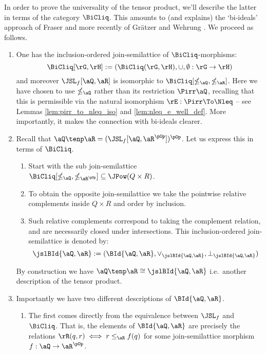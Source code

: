 \documentclass{article}
\begin{document}
In order to prove the universality of the tensor product, we'll describe the latter in terms of the category $\BiCliq$. This amounts to (and explains) the `bi-ideals' approach of Fraser \cite{Fraser1978} and more recently of Gr\"{a}tzer and Wehrung \cite{GratzerTensorSemilattices2005}. We proceed as follows.
\begin{enumerate}
\item
One has the inclusion-ordered join-semilattice of $\BiCliq$-morphisms:
\[
\BiCliq[\rG,\rH] := (\BiCliq(\rG,\rH),\cup,\emptyset : \rG \to \rH)
\]
and moreover $\JSL_f[\aQ,\aR]$ is isomorphic to $\BiCliq[\nleq_\aQ, \nleq_\aR]$. Here we have chosen to use $\nleq_\aQ$ rather than its restriction $\Pirr\aQ$, recalling that this is permissible via the natural isomorphism $\rE : \Pirr \To \Nleq$ -- see Lemmas \ref{lem:pirr_to_nleq_iso} and \ref{lem:nleq_e_well_def}. More importantly, it makes the connection with bi-ideals clearer.

\item
Recall that $\aQ \tenp \aR = (\JSL_f[\aQ,\aR^{\pOp}])^{\pOp}$. Let us express this in terms of $\BiCliq$.
\begin{enumerate}
\item
Start with the sub join-semilattice $\BiCliq[\nleq_\aQ,\nleq_{\aR^{\pOp}}] \subseteq \JPow (Q \times R)$.
\item
To obtain the opposite join-semilattice we take the pointwise relative complements inside $Q \times R$ and order by inclusion.
\item
Such relative complements correspond to taking the complement relation, and are necessarily closed under intersections. This inclusion-ordered join-semilattice is denoted by:
\[
\jslBId{\aQ,\aR} := (\BId{\aQ,\aR},\lor_{\jslBId{\aQ,\aR}},\bot_{\jslBId{\aQ,\aR}})
\]
\end{enumerate}

By construction we have $\aQ \tenp \aR \cong \jslBId{\aQ,\aR}$ i.e.\ another description of the tensor product.

\item
Importantly we have two different descriptions of $\BId{\aQ,\aR}$.

\begin{enumerate}
\item
The first comes directly from the equivalence between $\JSL_f$ and $\BiCliq$. That is, the  elements of $\BId{\aQ,\aR}$ are precisely the relations $\rR(q,r) \iff r \leq_\aR f(q)$ for some join-semilattice morphism $f : \aQ \to \aR^{\pOp}$.


\end{enumerate}
\end{enumerate}
\end{document}
